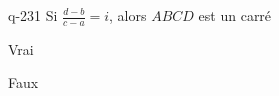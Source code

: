 \begin{truefalse}{q-231}
Si $\frac{d-b}{c-a} =i$, alors $ABCD$ est un carré
\item Vrai
\item* Faux
\end{truefalse}

